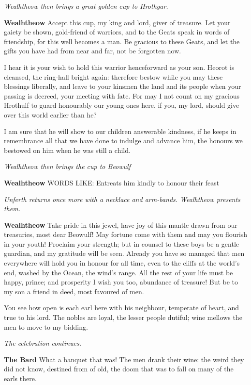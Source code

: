 \documentclass[a4paper]{article}
\begin{document}
{\centerline{\textit{Wealhtheow then brings a great golden cup to Hrothgar.}}

\textbf{Wealhtheow} Accept this cup, my king and lord,
giver of treasure. Let your gaiety be shown,
gold-friend of warriors, and to the Geats speak
in words of friendship, for this well becomes a man.
Be gracious to these Geats, and let the gifts you have had
from near and far, not be forgotten now.

I hear it is your wish to hold this warrior
henceforward as your son. Heorot is cleansed,
the ring-hall bright again: therefore bestow while you may
these blessings liberally, and leave to your kinsmen
the land and its people when your passing is decreed,
your meeting with fate. For may I not count
on my gracious Hrothulf to guard honourably
our young ones here, if you, my lord,
should give over this world earlier than he?

I am sure that he will show to our children
answerable kindness, if he keeps in remembrance
all that we have done to indulge and advance him,
the honours we bestowed on him when he was still a child.

\centerline{\textit{Wealhtheow then brings the cup to Beowulf}}

\textbf{Wealhtheow} WORDS LIKE: Entreats him kindly to honour their feast

\centerline{\textit{Unferth returns once more with a necklace and arm-bands. Wealhtheow presents them.}}

\textbf{Wealhtheow} Take pride in this jewel, have joy of this mantle
drawn from our treasuries, most dear Beowulf!
May fortune come with them and may you flourish in your youth!
Proclaim your strength; but in counsel to these boys
be a gentle guardian, and my gratitude will be seen.
Already you have so managed that men everywhere
will hold you in honour for all time,
even to the cliffs at the world’s end, washed by the Ocean,
the wind’s range. All the rest of your life
must be happy, prince; and prosperity I wish you too,
abundance of treasure! But be to my son
a friend in deed, most favoured of men.

You see how open is each earl here with his neighbour,
temperate of heart, and true to his lord.
The nobles are loyal, the lesser people dutiful;
wine mellows the men to move to my bidding.

\centerline{\textit{The celebration continues.}}

\textbf{The Bard} What a banquet that was!
The men drank their wine: the weird they did not know,
destined from of old, the doom that was to fall
on many of the earls there.

}
\end{document}
